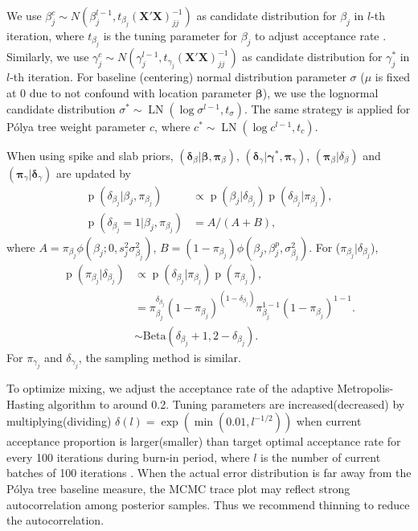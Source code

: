 \documentclass[12pt]{article}
\newcommand{\polya}{P\'{o}lya}
\DeclareMathOperator{\pr}{p}
\DeclareMathOperator{\LN}{LN}
\begin{document}
We use $\beta_j^c \sim N(\beta_j^{l-1}, t_{\beta_j}
(\bm{X'X})^{-1}_{jj})$ as candidate distribution for $\beta_j$ in
$l$-th iteration, where $t_{\beta_j}$ is the tuning parameter for
$\beta_j$ to adjust acceptance rate \citep{jara2009}.  Similarly, we
use $\gamma_j^c \sim N(\gamma_j^{l-1},
t_{\gamma_j}(\bm{X'X})^{-1}_{jj})$ as candidate distribution for
$\gamma_j^{*}$ in $l$-th iteration.  For baseline (centering) normal
distribution parameter $\sigma$ ($\mu$ is fixed at 0 due to not
confound with location parameter $\bm \beta$), we use the lognormal
candidate distribution $\sigma^* \sim \LN(\log \sigma^{l-1},
t_{\sigma})$. The same strategy is applied for \polya{} tree weight
parameter $c$, where $c^* \sim \LN(\log c^{l-1}, t_c)$.

When using spike and slab priors,
$(\bm \delta_{\beta}|\bm \beta, \bm \pi_{\beta})$, $(\bm \delta_{\gamma}|\bm
\gamma^{*}, \bm \pi_{\gamma})$, $(\bm \pi_{\beta}|\delta_{\beta})$ and
$(\bm \pi_{\gamma}|\bm \delta_{\gamma})$ are updated by
\begin{align*}
  \pr(\delta_{\beta_j}|\beta_j, \pi_{\beta_j}) & \propto \pr(\beta_j |
  \delta_{\beta_j})
  \pr(\delta_{\beta_j}|\pi_{\beta_j}) ,\\
  \pr(\delta_{\beta_j} = 1|\beta_j, \pi_{\beta_j})& = A/(A + B),
\end{align*}
where $A = \pi_{\beta_j}\phi (\beta_j;0, s_j^2\sigma_{\beta_j}^2)$, $B
= (1-\pi_{\beta_j})\phi(\beta_j, \beta_j^p, \sigma_{\beta_j}^2)$.  For
($\pi_{\beta_j}|\delta_{\beta_j}$),
\begin{align*}
  \pr(\pi_{\beta_j}| \delta_{\beta_j}) & \propto \pr(\delta_{\beta_j}|\pi_{\beta_j}) \pr(\pi_{\beta_j}) ,\\
  & = \pi_{\beta_j}^{\delta_{\beta_j}} (1 - \pi_{\beta_j})^{(1 -
    \delta_{\beta_j})}
  \pi_{\beta_j}^{1 - 1}(1 - \pi_{\beta_j})^{1-1}.\\
  & \sim \mbox{Beta}(\delta_{\beta_j} + 1, 2 - \delta_{\beta_j}).
\end{align*}
For $\pi_{\gamma_j}$ and $\delta_{\gamma_j}$, the sampling method is
similar.

To optimize mixing, we adjust the acceptance rate of the adaptive
Metropolis-Hasting algorithm to around 0.2.  Tuning parameters are
increased(decreased) by multiplying(dividing) $\delta(l) =
\exp(\min(0.01, l^{-1/2}))$ when current acceptance proportion is
larger(smaller) than target optimal acceptance rate for every 100
iterations during burn-in period, where $l$ is the number of current
batches of 100 iterations \citep{jara2009}. When the actual error
distribution is far away from the \polya{} tree baseline measure, the
MCMC trace plot may reflect strong autocorrelation among posterior
samples. Thus we recommend thinning to reduce the autocorrelation.
\end{document}
